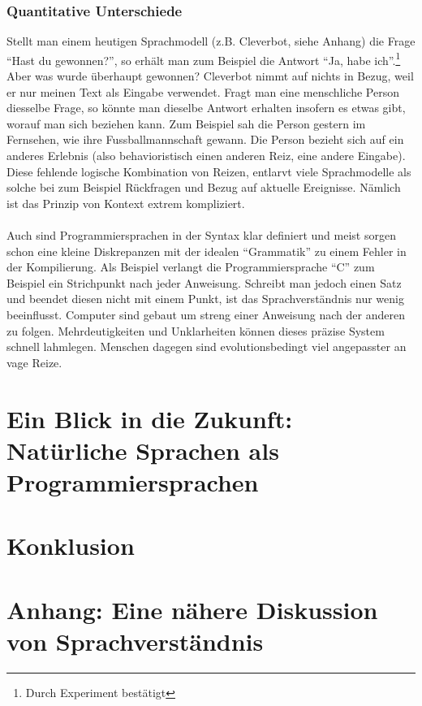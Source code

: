 \documentclass[a4paper,10pt]{article}
\begin{document}
\subsubsection{Quantitative Unterschiede}
Stellt man einem heutigen Sprachmodell (z.B. Cleverbot, siehe Anhang) die Frage \enquote{Hast du gewonnen?}, so erhält man zum Beispiel die Antwort \enquote{Ja, habe ich}.\footnote{Durch Experiment bestätigt} Aber was wurde überhaupt gewonnen? Cleverbot nimmt auf nichts in Bezug, weil er nur meinen Text als Eingabe verwendet. Fragt man eine menschliche Person diesselbe Frage, so könnte man dieselbe Antwort erhalten insofern es etwas gibt, worauf man sich beziehen kann. Zum Beispiel sah die Person gestern im Fernsehen, wie ihre Fussballmannschaft gewann. Die Person bezieht sich auf ein anderes Erlebnis (also behavioristisch einen anderen Reiz, eine andere Eingabe). \\
Diese fehlende logische Kombination von Reizen, entlarvt viele Sprachmodelle als solche bei zum Beispiel Rückfragen und Bezug auf aktuelle Ereignisse. Nämlich ist das Prinzip von Kontext extrem kompliziert. \\
\\
Auch sind Programmiersprachen in der Syntax klar definiert und meist sorgen schon eine kleine Diskrepanzen mit der idealen \enquote{Grammatik} zu einem Fehler in der Kompilierung. Als Beispiel verlangt die Programmiersprache \enquote{C} zum Beispiel ein Strichpunkt nach jeder Anweisung. Schreibt man jedoch einen Satz und beendet diesen nicht mit einem Punkt, ist das Sprachverständnis nur wenig beeinflusst. Computer sind gebaut um streng einer Anweisung nach der anderen zu folgen. Mehrdeutigkeiten und Unklarheiten können dieses präzise System schnell lahmlegen. Menschen dagegen sind evolutionsbedingt viel angepasster an vage Reize. \\



\section{Ein Blick in die Zukunft: Natürliche Sprachen als Programmiersprachen}
\blindtext[1]


\section{Konklusion}
\blindtext[1]


\section{Anhang: Eine nähere Diskussion von Sprachverständnis}
\end{document}
